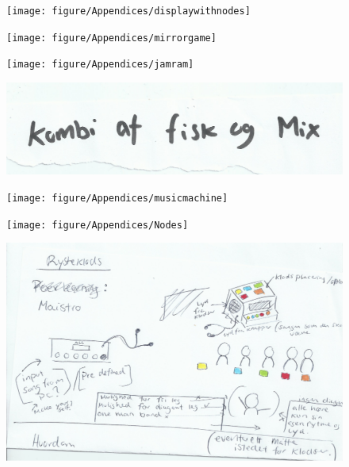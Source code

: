 \begin{figure}[H]
	\centering
	\texttt{[image: figure/Appendices/displaywithnodes]}
	\label{fig:displaywithnodes}
	\caption{}
	
\end{figure}

\begin{figure}[H]
	\centering
	\texttt{[image: figure/Appendices/mirrorgame]}
	\label{fig:mirrorgame}
	\caption{}
	
\end{figure}

\begin{figure}[H]
	\centering
	\texttt{[image: figure/Appendices/jamram]}
	\label{fig:jamram}
	\caption{}
	
\end{figure}

\begin{figure}[H]
	\centering
	\includegraphics[width=0.7\linewidth]{figure/Appendices/kombiAfFiskOgMix}
	\label{fig:kombiAfFiskOgMix}
	\caption{}
	
\end{figure}

\begin{figure}[H]
	\centering
	\texttt{[image: figure/Appendices/musicmachine]}
	\label{fig:musicmachine}
	\caption{}
	
\end{figure}

\begin{figure}[H]
	\centering
	\texttt{[image: figure/Appendices/Nodes]}
	\label{fig:Nodes}
	\caption{}
	
\end{figure}

\begin{figure}[H]
	\centering
	\includegraphics[width=0.7\linewidth]{figure/Appendices/rysteklods}
	\label{fig: rysteklods}
	\caption{}
	
\end{figure}

